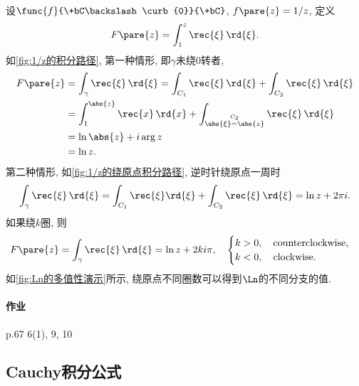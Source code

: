 \documentclass[../ComplexVariable.tex]{subfiles}
\begin{document}
\begin{sample}
    \begin{ex}
        设$\func{f}{\+bC\backslash \curb{0}}{\+bC}$, $f\pare{z} =1/z$, 定义
        \[ F\pare{z} = \int_1^z \rec{\xi}\,\rd{\xi}. \]
        如\cref{fig:1/z的积分路径}, 第一种情形, 即$\gamma$未绕$0$转者,
        \begin{align*}
            F\pare{z} &= \int_\gamma \rec{\xi}\,\rd{\xi} = \int_{C_1} \rec{\xi}\,\rd{\xi} + \int_{C_2}\rec{\xi}\,\rd{\xi} \\
            &= \int_1^{\abs{z}} \rec{x}\,\rd{x} + \int_{\stackrel{C_2}{\abs{\xi}=\abs{z}}} \rec{\xi}\,\rd{\xi} \\
            &= \ln \abs{z} + i\arg z \\
            &= \ln z.
        \end{align*}
        第二种情形, 如\cref{fig:1/z的绕原点积分路径}, 逆时针绕原点一周时
        \[ \int_\gamma \rec{\xi}\,\rd{\xi} = \int_{C_1} \rec{\xi}\rd{\xi} + \int_{C_2} \rec{\xi}\,\rd{\xi} = \ln z + 2\pi i. \]
        如果绕$k$圈, 则
        \[ F\pare{z} = \int_\gamma \rec{\xi}\,\rd{\xi} = \ln z + 2ki\pi,\quad \begin{cases}
            k>0,\quad \mathrm{counterclockwise},\\
            k<0,\quad \mathrm{clockwise}.
        \end{cases} \]
        如\cref{fig:Ln的多值性演示}所示, 绕原点不同圈数可以得到$\Ln$的不同分支的值.
    \end{ex}
\end{sample}

\paragraph{作业} %
\label{par:作业}

p.67 6(1), 9, 10



\subsection{Cauchy积分公式} %
\label{sub:cauchy积分公式}
\end{document}
